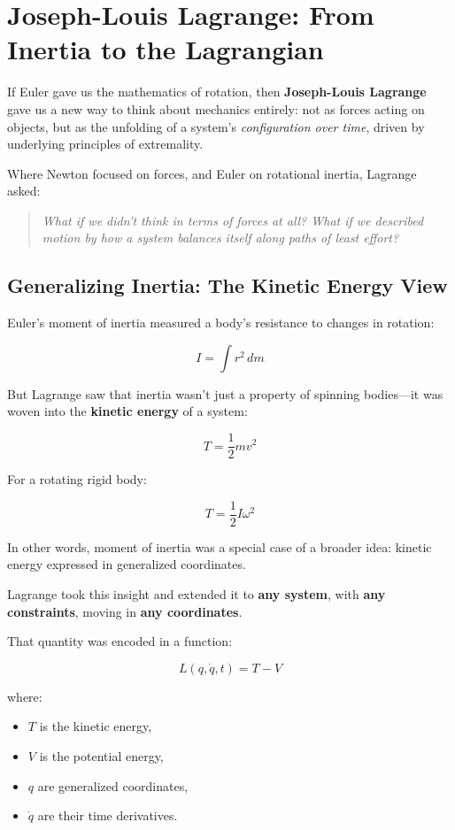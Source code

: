 \section{Joseph-Louis Lagrange: From Inertia to the Lagrangian}

If Euler gave us the mathematics of rotation, then \textbf{Joseph-Louis Lagrange} gave us a new way to think about mechanics entirely: not as forces acting on objects, but as the unfolding of a system’s \textit{configuration over time}, driven by underlying principles of extremality.

Where Newton focused on forces, and Euler on rotational inertia, Lagrange asked:

\begin{quote}
\textit{What if we didn’t think in terms of forces at all? What if we described motion by how a system balances itself along paths of least effort?}
\end{quote}

\subsection{Generalizing Inertia: The Kinetic Energy View}

Euler’s moment of inertia measured a body’s resistance to changes in rotation:

\[
I = \int r^2 \, dm
\]

But Lagrange saw that inertia wasn’t just a property of spinning bodies—it was woven into the \textbf{kinetic energy} of a system:

\[
T = \frac{1}{2} m v^2
\]

For a rotating rigid body:

\[
T = \frac{1}{2} I \omega^2
\]

In other words, moment of inertia was a special case of a broader idea: kinetic energy expressed in generalized coordinates.

Lagrange took this insight and extended it to \textbf{any system}, with \textbf{any constraints}, moving in \textbf{any coordinates}. 

That quantity was encoded in a function:

\[
L(q, \dot{q}, t) = T - V
\]

where:

\begin{itemize}
  \item \( T \) is the kinetic energy,
  \item \( V \) is the potential energy,
  \item \( q \) are generalized coordinates,
  \item \( \dot{q} \) are their time derivatives.
\end{itemize}

